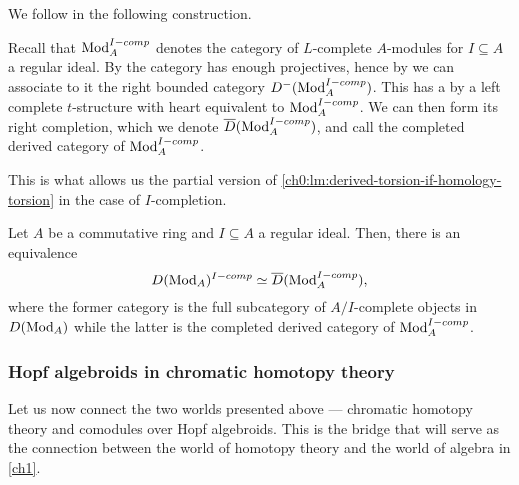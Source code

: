 We follow \cite{barthel-heard-valenzuela_2020} in the following construction. 

\begin{construction}
    \label{ch0:const:completed-derived-category}
    Recall that $\mathrm{Mod}_A^{I-comp}$ denotes the category of $L$-complete $A$-modules for $I\subseteq A$ a regular ideal. By \cite[2.11]{barthel-heard-valenzuela_2020} the category has enough projectives, hence by \cite[1.3.2]{Lurie_HA} we can associate to it the right bounded category $D^-(\mathrm{Mod}_A^{I-comp})$. This has a by \cite[1.3.2.19, 1.3.3.16]{Lurie_HA} a left complete $t$-structure with heart equivalent to $\mathrm{Mod}_A^{I-comp}$. We can then form its right completion, which we denote $\overline{D}(\mathrm{Mod}_A^{I-comp})$, and call the completed derived category of $\mathrm{Mod}_A^{I-comp}$. 
\end{construction}

This is what allows us the partial version of \cref{ch0:lm:derived-torsion-if-homology-torsion} in the case of $I$-completion. 

\begin{proposition}
    \label{ch0:prop:pulling-out-completion}
    Let $A$ be a commutative ring and $I\subseteq A$ a regular ideal. Then, there is an equivalence 
    $$D(\mathrm{Mod}_A)^{I-comp}\simeq \overline{D}(\mathrm{Mod}_A^{I-comp}),$$
    where the former category is the full subcategory of $A/I$-complete objects in $D(\mathrm{Mod}_A)$ while the latter is the completed derived category of $\mathrm{Mod}_A^{I-comp}$. 
\end{proposition}








\subsubsection{Hopf algebroids in chromatic homotopy theory}

Let us now connect the two worlds presented above --- chromatic homotopy theory and comodules over Hopf algebroids. This is the bridge that will serve as the connection between the world of homotopy theory and the world of algebra in \cref{ch1}. 


